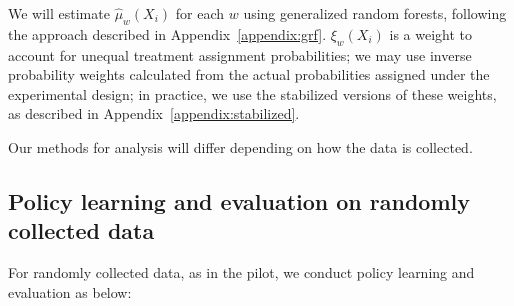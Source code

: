 \documentclass[letterpaper, 12pt, parskip=full,]{scrartcl}
\begin{document}
We will estimate $\hat\mu_{w}(X_{i})$ for each $w$ using generalized random forests, following the approach described in Appendix~\ref{appendix:grf}. $\xi_w(X_i)$ is a weight to account for unequal treatment assignment probabilities; we may use inverse probability weights calculated from the actual probabilities assigned under the experimental design; in practice, we use the stabilized versions of these weights, as described in Appendix~\ref{appendix:stabilized}.  %

Our methods for analysis will differ depending on how the data is collected. 

\subsection{Policy learning and evaluation on randomly collected data}\label{randomlearning}
For randomly collected data, as in the pilot, we conduct policy learning and evaluation as below:
\end{document}

